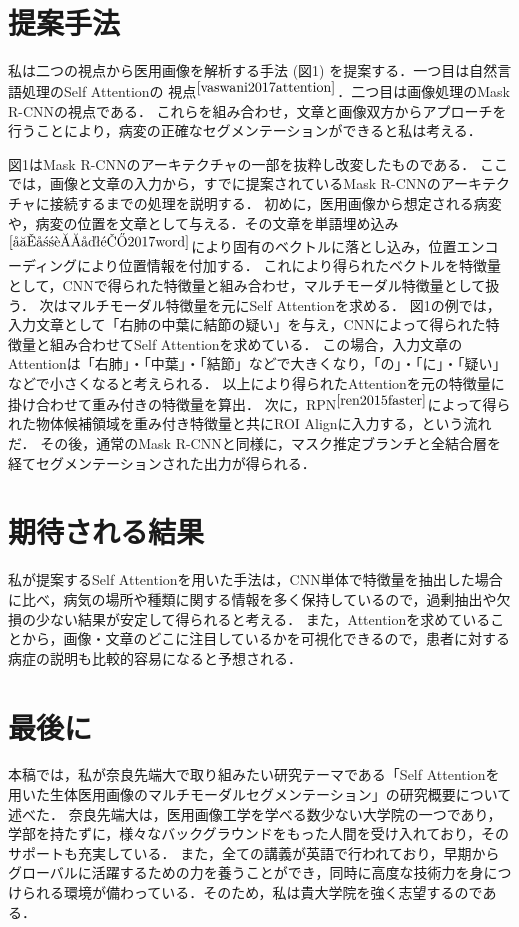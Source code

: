 \documentclass[a4j,10pt,twocolumn]{jarticle}
\begin{document}
\section{提案手法}
私は二つの視点から医用画像を解析する手法 (図1) を提案する．一つ目は自然言語処理のSelf Attentionの
視点{$^{\cite{vaswani2017attention}}$}．二つ目は画像処理のMask R-CNNの視点である．
これらを組み合わせ，文章と画像双方からアプローチを行うことにより，病変の正確なセグメンテーションができると私は考える．

図1はMask R-CNNのアーキテクチャの一部を抜粋し改変したものである．
ここでは，画像と文章の入力から，すでに提案されているMask R-CNNのアーキテクチャに接続するまでの処理を説明する．
初めに，医用画像から想定される病変や，病変の位置を文章として与える．その文章を単語埋め込み{$^{\cite{堅山耀太郎2017word}}$}により固有のベクトルに落とし込み，位置エンコーディングにより位置情報を付加する．
これにより得られたベクトルを特徴量として，CNNで得られた特徴量と組み合わせ，マルチモーダル特徴量として扱う．
次はマルチモーダル特徴量を元にSelf Attentionを求める．
図1の例では，入力文章として「右肺の中葉に結節の疑い」を与え，CNNによって得られた特徴量と組み合わせてSelf Attentionを求めている．
この場合，入力文章のAttentionは「右肺」・「中葉」・「結節」などで大きくなり，「の」・「に」・「疑い」などで小さくなると考えられる．
以上により得られたAttentionを元の特徴量に掛け合わせて重み付きの特徴量を算出．
次に，RPN{$^{\cite{ren2015faster}}$}によって得られた物体候補領域を重み付き特徴量と共にROI Alignに入力する，という流れだ．
その後，通常のMask R-CNNと同様に，マスク推定ブランチと全結合層を経てセグメンテーションされた出力が得られる．
\section{期待される結果}
私が提案するSelf Attentionを用いた手法は，CNN単体で特徴量を抽出した場合に比べ，病気の場所や種類に関する情報を多く保持しているので，過剰抽出や欠損の少ない結果が安定して得られると考える．
また，Attentionを求めていることから，画像・文章のどこに注目しているかを可視化できるので，患者に対する病症の説明も比較的容易になると予想される．

\section{最後に}
本稿では，私が奈良先端大で取り組みたい研究テーマである「Self Attentionを用いた生体医用画像のマルチモーダルセグメンテーション」の研究概要について述べた．
奈良先端大は，医用画像工学を学べる数少ない大学院の一つであり，学部を持たずに，様々なバックグラウンドをもった人間を受け入れており，そのサポートも充実している．
また，全ての講義が英語で行われており，早期からグローバルに活躍するための力を養うことができ，同時に高度な技術力を身につけられる環境が備わっている．そのため，私は貴大学院を強く志望するのである．

{\scriptsize


}
\end{document}
